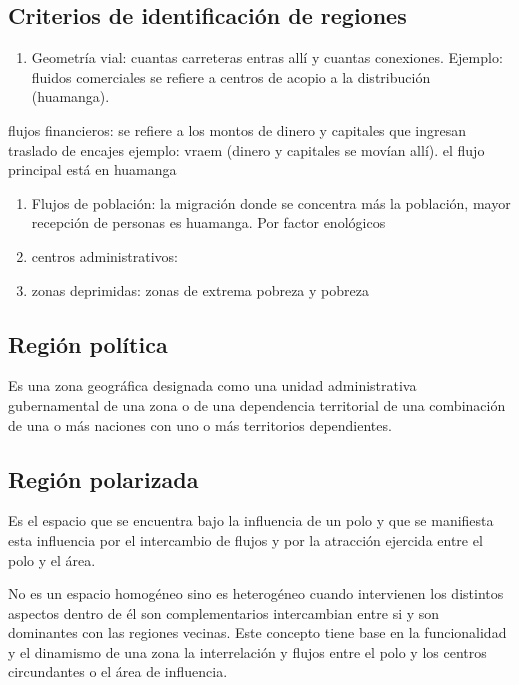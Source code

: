 \documentclass[
  jou,
  floatsintext,
  longtable,
  a4paper,
  nolmodern,
  notxfonts,
  notimes,
  12pt,
  colorlinks=true,linkcolor=blue,citecolor=blue,urlcolor=blue]{apa7}
\providecommand{\tightlist}{%
  \setlength{\itemsep}{0pt}\setlength{\parskip}{0pt}}
\begin{document}
\subsection{Criterios de identificación de
regiones}\label{criterios-de-identificaciuxf3n-de-regiones}

\begin{enumerate}
\def\labelenumi{\arabic{enumi}.}
\tightlist
\item
  Geometría vial: cuantas carreteras entras allí y cuantas conexiones.
  Ejemplo: fluidos comerciales se refiere a centros de acopio a la
  distribución (huamanga).
\end{enumerate}

flujos financieros: se refiere a los montos de dinero y capitales que
ingresan traslado de encajes ejemplo: vraem (dinero y capitales se
movían allí). el flujo principal está en huamanga

\begin{enumerate}
\def\labelenumi{\arabic{enumi}.}
\setcounter{enumi}{1}
\tightlist
\item
  Flujos de población: la migración donde se concentra más la población,
  mayor recepción de personas es huamanga. Por factor enológicos
\item
  centros administrativos:
\item
  zonas deprimidas: zonas de extrema pobreza y pobreza
\end{enumerate}

\subsection{Región política}\label{regiuxf3n-poluxedtica}

Es una zona geográfica designada como una unidad administrativa
gubernamental de una zona o de una dependencia territorial de una
combinación de una o más naciones con uno o más territorios
dependientes.

\subsection{Región polarizada}\label{regiuxf3n-polarizada}

Es el espacio que se encuentra bajo la influencia de un polo y que se
manifiesta esta influencia por el intercambio de flujos y por la
atracción ejercida entre el polo y el área.

No es un espacio homogéneo sino es heterogéneo cuando intervienen los
distintos aspectos dentro de él son complementarios intercambian entre
si y son dominantes con las regiones vecinas. Este concepto tiene base
en la funcionalidad y el dinamismo de una zona la interrelación y flujos
entre el polo y los centros circundantes o el área de influencia.
\end{document}
